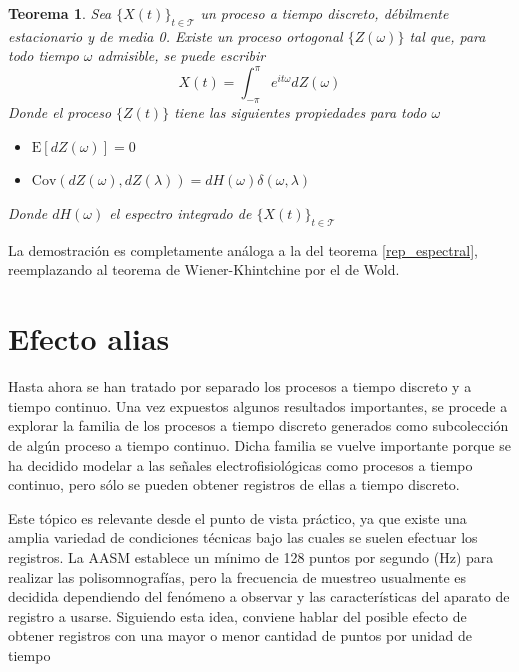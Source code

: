 \documentclass[12pt,letterpaper]{book}
\newtheorem{teorema}{Teorema}[chapter]
\newcommand{\intPI}{\int_{-\pi}^{\pi}}
\newcommand{\E}[1]{\mathrm{E}\left[ #1 \right]}
\newcommand{\Cov}[1]{\mathrm{Cov}\left( #1 \right)}
\newcommand{\xt}{$\{X(t)\}_{t\in \mathcal{T}}$ }
\newcommand{\hz}{\si{\hertz}\xspace}
\begin{document}
\begin{teorema}
Sea \xt un proceso a tiempo discreto, débilmente estacionario y de media 0. Existe un proceso ortogonal $\{Z(\omega)\}$ tal que, para todo tiempo $\omega$ admisible, se puede escribir
\begin{equation*}
X(t) = \intPI e^{i t \omega} dZ(\omega)
\end{equation*}
Donde el proceso $\{Z(t)\}$ tiene las siguientes propiedades para todo $\omega$
\begin{itemize}
\item $\E{dZ(\omega)} = 0$
\item $\Cov{dZ(\omega),dZ(\lambda)} = dH(\omega) \delta(\omega, \lambda)$
\end{itemize}
Donde $dH(\omega)$ el espectro integrado de \xt
\label{rep_espectral2}
\end{teorema}

La demostración es completamente análoga a la del teorema \ref{rep_espectral}, reemplazando al teorema de Wiener-Khintchine por el de Wold. 


\section{Efecto {alias}}

Hasta ahora se han tratado por separado los procesos a tiempo discreto y a tiempo continuo. 
%
Una vez expuestos algunos resultados importantes, se procede a explorar la familia de los procesos a tiempo discreto generados como subcolección de algún proceso a tiempo continuo. 
%
Dicha familia se vuelve importante porque se ha decidido modelar a las señales electrofisiológicas como procesos a tiempo continuo, pero sólo se pueden obtener registros de ellas a tiempo discreto.

Este tópico es relevante desde el punto de vista práctico, ya que existe una amplia variedad de condiciones técnicas bajo las cuales se suelen efectuar los registros. La AASM establece un mínimo de 128 puntos por segundo (\hz) para realizar las polisomnografías, pero la frecuencia de muestreo usualmente es decidida dependiendo del fenómeno a observar y las características del aparato de registro a usarse.
%
Siguiendo esta idea, conviene hablar del posible efecto de obtener registros con una mayor o menor cantidad de puntos por unidad de tiempo
\end{document}
